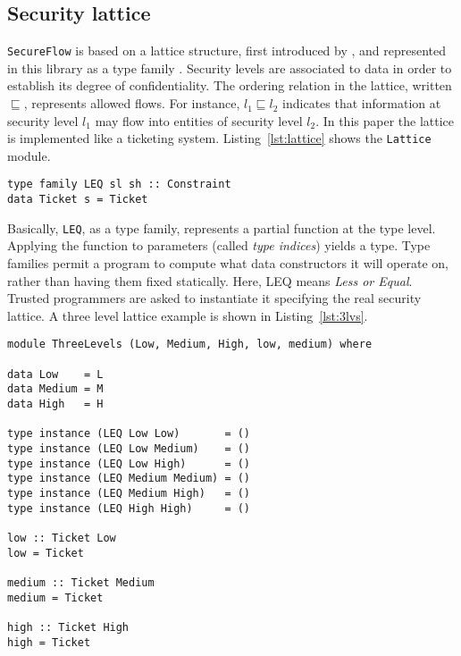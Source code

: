 \subsection{Security lattice}
\texttt{SecureFlow} is based on a lattice structure, first introduced by \citeauthor{denning1976lattice} \cite{denning1976lattice}, and represented in this library as a type family \cite{kiselyov2010fun}. Security levels are associated to data in order to establish its degree of confidentiality. The ordering relation in the lattice, written $\sqsubseteq$, represents allowed flows. For instance, $l_{1} \sqsubseteq l_{2}$ indicates that information at security level $l_{1}$ may flow into entities of security level $l_{2}$. In this paper the lattice is implemented like a ticketing system. Listing~\ref{lst:lattice} shows the \texttt{Lattice} module. 
\begin{lstlisting}[caption={The Lattice module}, label={lst:lattice}, breaklines=true]
type family LEQ sl sh :: Constraint
data Ticket s = Ticket
\end{lstlisting}
Basically, \texttt{LEQ}, as a type family, represents a partial function at the type level. Applying the function to parameters (called \textit{type indices}) yields a type. Type families permit a program to compute what data constructors it will operate on, rather than having them fixed statically. Here, LEQ means \textit{Less or Equal}. Trusted programmers are asked to instantiate it specifying the real security lattice. A three level lattice example is shown in Listing~\ref{lst:3lvs}.
\begin{lstlisting}[caption={Three levels lattice}, label={lst:3lvs}, breaklines=true]
module ThreeLevels (Low, Medium, High, low, medium) where

data Low    = L
data Medium = M
data High   = H

type instance (LEQ Low Low)       = ()
type instance (LEQ Low Medium)    = ()
type instance (LEQ Low High)      = ()
type instance (LEQ Medium Medium) = ()
type instance (LEQ Medium High)   = ()
type instance (LEQ High High)     = ()

low :: Ticket Low
low = Ticket

medium :: Ticket Medium
medium = Ticket

high :: Ticket High
high = Ticket
\end{lstlisting}
